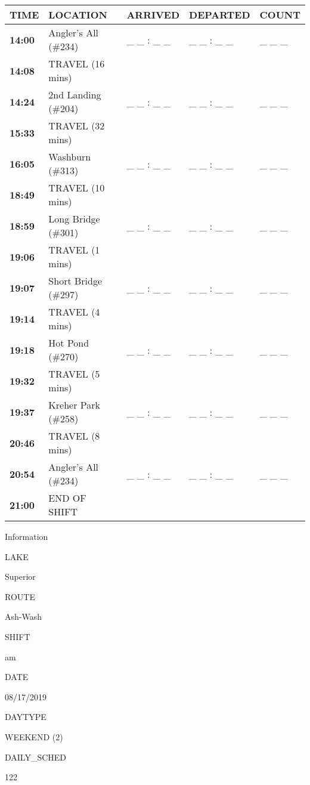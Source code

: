 \documentclass[]{article}
\begin{document}
\begin{tabular}{>{\bfseries}lllll}
\toprule
\textbf{TIME} & \textbf{LOCATION} & \textbf{ARRIVED} & \textbf{DEPARTED} & \textbf{COUNT}\\
\midrule
14:00 & Angler's All (\#234) & \_ \_ : \_ \_ & \_ \_ : \_ \_ & \_ \_ \_\\
14:08 & TRAVEL (16 mins) &  &  & \\
14:24 & 2nd Landing (\#204) & \_ \_ : \_ \_ & \_ \_ : \_ \_ & \_ \_ \_\\
15:33 & TRAVEL (32 mins) &  &  & \\
16:05 & Washburn (\#313) & \_ \_ : \_ \_ & \_ \_ : \_ \_ & \_ \_ \_\\
18:49 & TRAVEL (10 mins) &  &  & \\
18:59 & Long Bridge (\#301) & \_ \_ : \_ \_ & \_ \_ : \_ \_ & \_ \_ \_\\
19:06 & TRAVEL (1 mins) &  &  & \\
19:07 & Short Bridge (\#297) & \_ \_ : \_ \_ & \_ \_ : \_ \_ & \_ \_ \_\\
19:14 & TRAVEL (4 mins) &  &  & \\
19:18 & Hot Pond (\#270) & \_ \_ : \_ \_ & \_ \_ : \_ \_ & \_ \_ \_\\
19:32 & TRAVEL (5 mins) &  &  & \\
19:37 & Kreher Park (\#258) & \_ \_ : \_ \_ & \_ \_ : \_ \_ & \_ \_ \_\\
20:46 & TRAVEL (8 mins) &  &  & \\
20:54 & Angler's All (\#234) & \_ \_ : \_ \_ & \_ \_ : \_ \_ & \_ \_ \_\\
21:00 & END OF SHIFT &  &  & \\
\bottomrule
\end{tabular}\newpage

Information

LAKE

Superior

ROUTE

Ash-Wash

SHIFT

am

DATE

08/17/2019

DAYTYPE

WEEKEND (2)

DAILY\_SCHED

122

\vspace{24pt}
\end{document}
